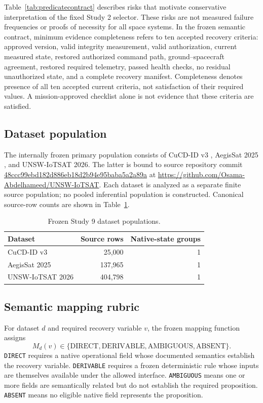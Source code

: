 \documentclass[preprint,12pt]{elsarticle}
\begin{document}
Table~\ref{tab:predicatecontract} describes risks that motivate conservative interpretation of the fixed Study 2 selector. These risks are not measured failure frequencies or proofs of necessity for all space systems. In the frozen semantic contract, minimum evidence completeness refers to ten accepted recovery criteria: approved version, valid integrity measurement, valid authorization, current measured state, restored authorized command path, ground--spacecraft agreement, restored required telemetry, passed health checks, no residual unauthorized state, and a complete recovery manifest. Completeness denotes presence of all ten accepted current criteria, not satisfaction of their required values. A mission-approved checklist alone is not evidence that these criteria are satisfied.

\subsection{Dataset population}

The internally frozen primary population consists of CuCD-ID v3 \cite{fayyaz2026cucddata}, AegisSat 2025 \cite{elovici2025aegissatdata}, and UNSW-IoTSAT 2026. The latter is bound to source repository commit \url{48ccc99ebd182d886eb18d2b94e95baba5a2a89a} at \url{https://github.com/Osama-Abdelhameed/UNSW-IoTSAT}. Each dataset is analyzed as a separate finite source population; no pooled inferential population is constructed. Canonical source-row counts are shown in Table~\ref{tab:datasets}.

\begin{table}[htbp]
\centering
\caption{Frozen Study 9 dataset populations.}
\label{tab:datasets}
\begin{tabular}{lrr}
\toprule
Dataset & Source rows & Native-state groups \\
\midrule
CuCD-ID v3 & 25,000 & 1 \\
AegisSat 2025 & 137,965 & 1 \\
UNSW-IoTSAT 2026 & 404,798 & 1 \\
\bottomrule
\end{tabular}
\end{table}

\subsection{Semantic mapping rubric}

For dataset $d$ and required recovery variable $v$, the frozen mapping function assigns
\begin{equation}
\label{eq:mapping}
M_d(v) \in \{\mathrm{DIRECT},\mathrm{DERIVABLE},\mathrm{AMBIGUOUS},\mathrm{ABSENT}\}.
\end{equation}
\texttt{DIRECT} requires a native operational field whose documented semantics establish the recovery variable. \texttt{DERIVABLE} requires a frozen deterministic rule whose inputs are themselves available under the allowed interface. \texttt{AMBIGUOUS} means one or more fields are semantically related but do not establish the required proposition. \texttt{ABSENT} means no eligible native field represents the proposition.
\end{document}
